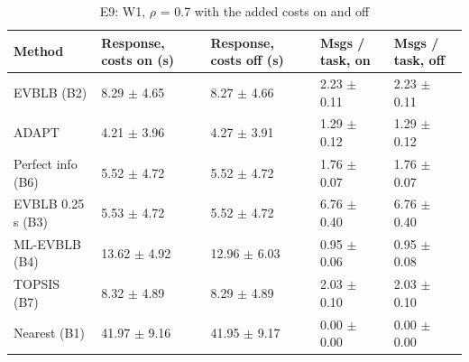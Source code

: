 \begin{table}[t]
\centering
\footnotesize
\caption{E9: W1, $\rho$ = 0.7 with the added costs on and off}
\label{tab:e9}
\begin{tabular}{lllll}
\toprule
Method & Response, costs on (s) & Response, costs off (s) & Msgs / task, on & Msgs / task, off \\
\midrule
EVBLB (B2) & 8.29 $\pm$ 4.65 & 8.27 $\pm$ 4.66 & 2.23 $\pm$ 0.11 & 2.23 $\pm$ 0.11 \\
ADAPT & 4.21 $\pm$ 3.96 & 4.27 $\pm$ 3.91 & 1.29 $\pm$ 0.12 & 1.29 $\pm$ 0.12 \\
Perfect info (B6) & 5.52 $\pm$ 4.72 & 5.52 $\pm$ 4.72 & 1.76 $\pm$ 0.07 & 1.76 $\pm$ 0.07 \\
EVBLB 0.25 s (B3) & 5.53 $\pm$ 4.72 & 5.52 $\pm$ 4.72 & 6.76 $\pm$ 0.40 & 6.76 $\pm$ 0.40 \\
ML-EVBLB (B4) & 13.62 $\pm$ 4.92 & 12.96 $\pm$ 6.03 & 0.95 $\pm$ 0.06 & 0.95 $\pm$ 0.08 \\
TOPSIS (B7) & 8.32 $\pm$ 4.89 & 8.29 $\pm$ 4.89 & 2.03 $\pm$ 0.10 & 2.03 $\pm$ 0.10 \\
Nearest (B1) & 41.97 $\pm$ 9.16 & 41.95 $\pm$ 9.17 & 0.00 $\pm$ 0.00 & 0.00 $\pm$ 0.00 \\
\bottomrule
\end{tabular}
\end{table}
